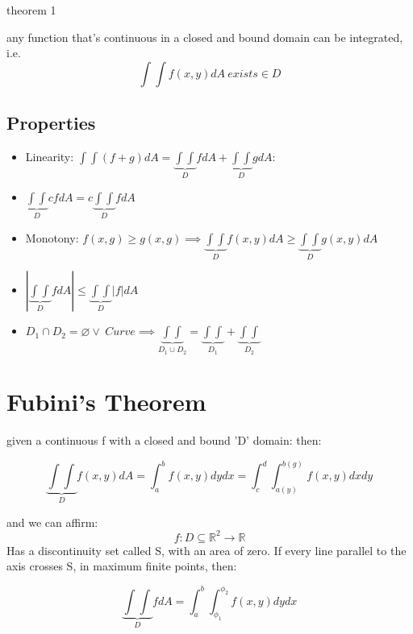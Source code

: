\documentclass[11pt,fleqn]{book} %
\begin{document}
theorem 1

any function that's continuous in a closed and bound domain can be integrated, i.e.
\begin{equation}
    \int \int f(x,y) dA \ exists \in D
\end{equation}

\subsection{Properties}

\begin{itemize}
    \item Linearity: $\int \int (f+g) d A = \underbrace{\int \int}_{D} fdA + \underbrace{\int \int}_{D} gdA$:
    \item $\underbrace{\int \int}_{D} c fdA = c \underbrace{\int \int}_{D} fdA$
    \item Monotony: $f(x,g) \geq g(x,g) \implies \underbrace{\int \int}_{D} f(x,y)dA \geq \underbrace{\int \int}_{D} g(x,y)dA$
    \item $|\underbrace{\int \int}_{D} f dA| \leq \underbrace{\int \int}_{D} |f| dA$
    \item $D_1 \cap D_2 = \varnothing \lor \ Curve \implies \underbrace{\int \int}_{D_1 \cup D_2} = \underbrace{\int \int}_{D_1} + \underbrace{\int \int}_{D_2} $ 
\end{itemize}

\section{Fubini's Theorem}
given a continuous f with a closed and bound 'D' domain: then:

\begin{equation}
    \underbrace{\int \int}_{D} f(x,y) dA = \int_a^b f(x,y) dy dx = \int_c^d \int_{a(y)}^{b(g)} f(x,y) dxdy
\end{equation}

and we can affirm:
\begin{equation}
    f: D \subseteq \mathbb{R}^2 \to \mathbb{R}
\end{equation} Has a discontinuity set called S, with an area of zero. If every line parallel to the axis crosses S, in maximum
finite points, then:

\begin{equation}
    \underbrace{\int \int}_{D} fdA = \int_a^b \int_{\phi_1}^{\phi_2} f(x,y) dydx
\end{equation}
\end{document}

